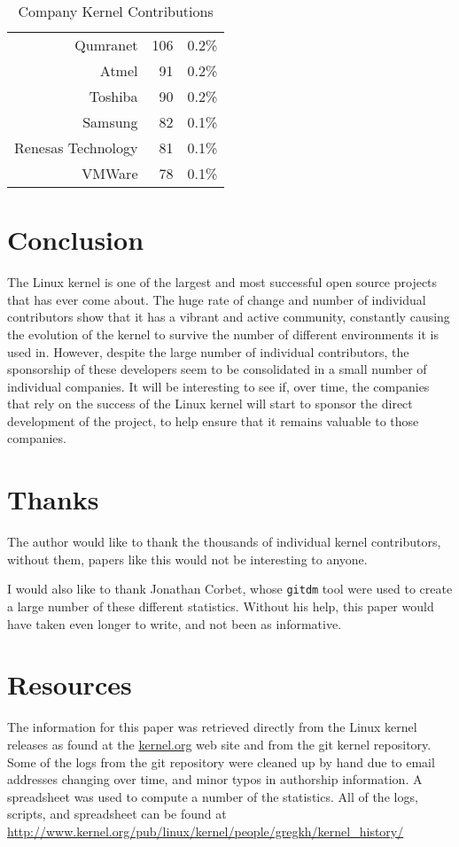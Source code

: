 \documentclass[final]{ols}
\begin{document}
\begin{table}[h!]
\begin{center}
\begin{small}
\begin{tabular}{|r|r|r|}
Qumranet                   & 106 & 0.2\% \\
Atmel                      &  91 & 0.2\% \\
Toshiba                    &  90 & 0.2\% \\
Samsung                    &  82 & 0.1\% \\
Renesas Technology         &  81 & 0.1\% \\
VMWare                     &  78 & 0.1\% \\
\hline
\end{tabular}
\end{small}
\caption{Company Kernel Contributions}
\label{gkh-num-companies}
\end{center}
\end{table}



\section{Conclusion}

The Linux kernel is one of the largest and most successful open source
projects that has ever come about.  The huge rate of change and number
of individual contributors show that it has a vibrant and active
community, constantly causing the evolution of the kernel to survive the
number of different environments it is used in.  However, despite the
large number of individual contributors, the sponsorship of these
developers seem to be consolidated in a small number of individual
companies.  It will be interesting to see if, over time, the companies
that rely on the success of the Linux kernel will start to sponsor the
direct development of the project, to help ensure that it remains
valuable to those companies.

\section{Thanks}

The author would like to thank the thousands of individual kernel
contributors, without them, papers like this would not be interesting to
anyone.

I would also like to thank Jonathan Corbet, whose \texttt{gitdm} tool
were used to create a large number of these different statistics.
Without his help, this paper would have taken even longer to write, and
not been as informative.

\section{Resources}

The information for this paper was retrieved directly from the Linux
kernel releases as found at the \url{kernel.org} web site and from the
git kernel repository.  Some of the logs from the git repository were
cleaned up by hand due to email addresses changing over time, and minor
typos in authorship information.  A spreadsheet was used to compute a
number of the statistics.  All of the logs, scripts, and spreadsheet can
be found at
\url{http://www.kernel.org/pub/linux/kernel/people/gregkh/kernel_history/}
\end{document}

